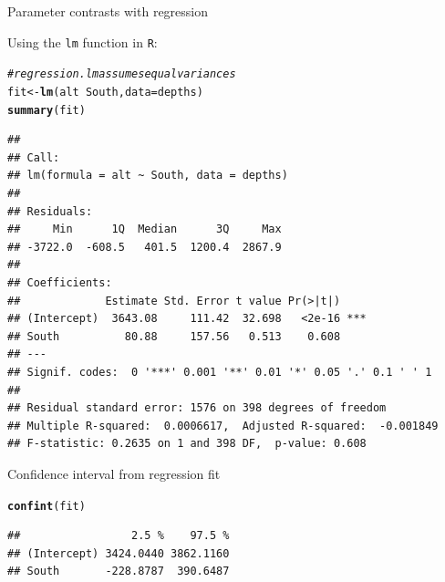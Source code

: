 \documentclass[handout]{beamer}\usepackage[]{graphicx}\usepackage[]{color}
\newcommand{\hlcom}[1]{\textcolor[rgb]{0.678,0.584,0.686}{\textit{#1}}}%
\newcommand{\hlopt}[1]{\textcolor[rgb]{0,0,0}{#1}}%
\newcommand{\hlstd}[1]{\textcolor[rgb]{0.345,0.345,0.345}{#1}}%
\newcommand{\hlkwb}[1]{\textcolor[rgb]{0.69,0.353,0.396}{#1}}%
\newcommand{\hlkwc}[1]{\textcolor[rgb]{0.333,0.667,0.333}{#1}}%
\newcommand{\hlkwd}[1]{\textcolor[rgb]{0.737,0.353,0.396}{\textbf{#1}}}%
\newenvironment{knitrout}{}{} %
\begin{document}
\begin{frame}[fragile]{Parameter contrasts with regression}

Using the \texttt{lm} function in \texttt{R}:


\begin{knitrout}\scriptsize
{}\color{fgcolor}
\begin{alltt}
\hlcom{# regression. lm assumes equal variances}
\hlstd{fit} \hlkwb{<-} \hlkwd{lm}\hlstd{(alt} \hlopt{~} \hlstd{South,} \hlkwc{data} \hlstd{= depths)}
\hlkwd{summary}\hlstd{(fit)}
\end{alltt}
\begin{verbatim}
## 
## Call:
## lm(formula = alt ~ South, data = depths)
## 
## Residuals:
##     Min      1Q  Median      3Q     Max 
## -3722.0  -608.5   401.5  1200.4  2867.9 
## 
## Coefficients:
##             Estimate Std. Error t value Pr(>|t|)    
## (Intercept)  3643.08     111.42  32.698   <2e-16 ***
## South          80.88     157.56   0.513    0.608    
## ---
## Signif. codes:  0 '***' 0.001 '**' 0.01 '*' 0.05 '.' 0.1 ' ' 1
## 
## Residual standard error: 1576 on 398 degrees of freedom
## Multiple R-squared:  0.0006617,	Adjusted R-squared:  -0.001849 
## F-statistic: 0.2635 on 1 and 398 DF,  p-value: 0.608
\end{verbatim}

\end{knitrout}


\end{frame}


\begin{frame}[fragile]{Confidence interval from regression fit}

\begin{knitrout}\scriptsize
{}\color{fgcolor}
\begin{alltt}
\hlkwd{confint}\hlstd{(fit)}
\end{alltt}
\begin{verbatim}
##                 2.5 %    97.5 %
## (Intercept) 3424.0440 3862.1160
## South       -228.8787  390.6487
\end{verbatim}

\end{knitrout}


\end{frame}
\end{document}
